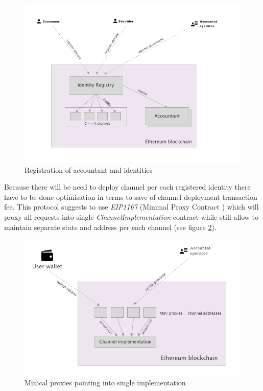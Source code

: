 \documentclass[a4paper,12pt]{article}
\begin{document}
\begin{figure}[H]
    \centering
    \includegraphics[scale=0.4]{../img/registration}
    \caption{Registration of accountant and identities}
    \label{img:registration}
\end{figure}

Because there will be need to deploy channel per each registered identity there 
have to be done optimisation in terms to save of channel deployment transaction 
fee. This protocol suggests to use \textit{EIP1167} (Minimal Proxy Contract 
\cite{eip1167}) which will proxy all requests into single 
\textit{ChannelImplementation} contract while still allow to maintain separate 
state and address per each channel (see figure \ref{img:proxy}).

\begin{figure}[H]
    \centering
    \includegraphics[scale=0.5]{../img/proxy}
    \caption{Minical proxies pointing into single implementation}
    \label{img:proxy}
\end{figure}
\end{document}
